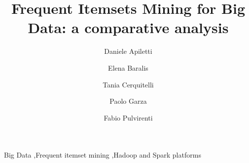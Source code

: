 \documentclass[preprint,review,12pt]{elsarticle}
\begin{document}
\begin{frontmatter}




\title{Frequent Itemsets Mining for Big Data: a comparative analysis}


\author{Daniele Apiletti}
\author{Elena Baralis}
\author{Tania Cerquitelli}
\author{Paolo Garza}
\author{Fabio Pulvirenti}


\address{Politecnico di Torino, Dipartimento Automatica e Informatica, Torino, Italy}

\begin{abstract}

\end{abstract}

\begin{keyword}
Big Data \sep Frequent itemset mining \sep Hadoop and Spark platforms




\end{keyword}

\end{frontmatter}

\end{document}
